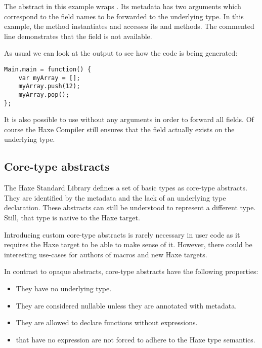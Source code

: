 
The  abstract in this example wraps . Its  metadata has two arguments which correspond to the field names to be forwarded to the underlying type. In this example, the  method instantiates  and accesses its  and  methods. The commented line demonstrates that the  field is not available.

As usual we can look at the  output to see how the code is being generated:

\begin{lstlisting}
Main.main = function() {
	var myArray = [];
	myArray.push(12);
	myArray.pop();
};
\end{lstlisting}

It is also possible to use  without any arguments in order to forward all fields. Of course the Haxe Compiler still ensures that the field actually exists on the underlying type.



\subsection{Core-type abstracts}
\label{types-abstract-core-type}

The Haxe Standard Library defines a set of basic types as core-type abstracts. They are identified by the  metadata and the lack of an underlying type declaration. These abstracts can still be understood to represent a different type. Still, that type is native to the Haxe target. 

Introducing custom core-type abstracts is rarely necessary in user code as it requires the Haxe target to be able to make sense of it. However, there could be interesting use-cases for authors of macros and new Haxe targets.

In contrast to opaque abstracts, core-type abstracts have the following properties:

\begin{itemize}
	\item They have no underlying type.
	\item They are considered nullable unless they are annotated with  metadata.
	\item They are allowed to declare  functions without expressions.
	\item {} that have no expression are not forced to adhere to the Haxe type semantics.
\end{itemize}



